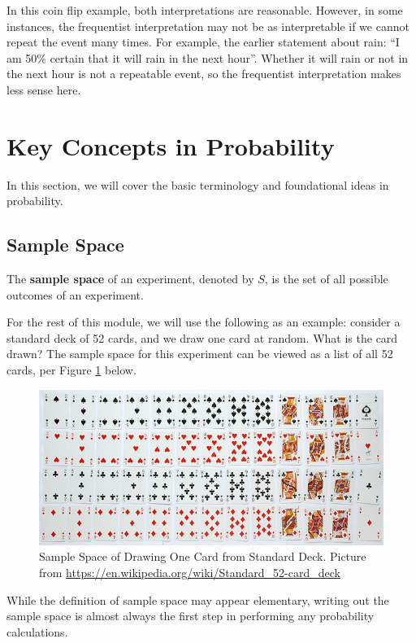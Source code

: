 \documentclass[
]{book}
\begin{document}
In this coin flip example, both interpretations are reasonable. However, in some instances, the frequentist interpretation may not be as interpretable if we cannot repeat the event many times. For example, the earlier statement about rain: ``I am 50\% certain that it will rain in the next hour''. Whether it will rain or not in the next hour is not a repeatable event, so the frequentist interpretation makes less sense here.

\section{Key Concepts in Probability}\label{key-concepts-in-probability}

In this section, we will cover the basic terminology and foundational ideas in probability.

\subsection{Sample Space}\label{sample-space}

The \textbf{sample space} of an experiment, denoted by \(S\), is the set of all possible outcomes of an experiment.

For the rest of this module, we will use the following as an example: consider a standard deck of 52 cards, and we draw one card at random. What is the card drawn? The sample space for this experiment can be viewed as a list of all 52 cards, per Figure \ref{fig:cards} below.

\begin{figure}
\centering
\includegraphics{images/02-cards.jpg}
\caption{\label{fig:cards}Sample Space of Drawing One Card from Standard Deck. Picture from \url{https://en.wikipedia.org/wiki/Standard_52-card_deck}}
\end{figure}

While the definition of sample space may appear elementary, writing out the sample space is almost always the first step in performing any probability calculations.
\end{document}
